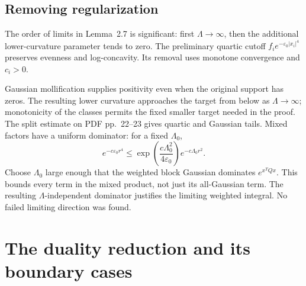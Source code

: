 \documentclass[10pt]{article}
\begin{document}
\subsection*{Removing regularization}
The order of limits in Lemma 2.7 is significant: first \(\Lambda\to\infty\), then the additional lower-curvature parameter tends to zero. The preliminary quartic cutoff \(f_i e^{-\varepsilon_0|x_i|^4}\) preserves evenness and log-concavity. Its removal uses monotone convergence and \(c_i>0\).\par
Gaussian mollification supplies positivity even when the original support has zeros. The resulting lower curvature approaches the target from below as \(\Lambda\to\infty\); monotonicity of the classes permits the fixed smaller target needed in the proof. The split estimate on PDF pp. 22–23 gives quartic and Gaussian tails. Mixed factors have a uniform dominator: for a fixed \(\Lambda_0\), \[e^{-c\varepsilon_0 r^4}
 \le \exp\!\left(\frac{c\Lambda_0^2}{4\varepsilon_0}\right)
       e^{-c\Lambda_0r^2}.\] Choose \(\Lambda_0\) large enough that the weighted block Gaussian dominates \(e^{x^TQx}\). This bounds every term in the mixed product, not just its all-Gaussian term. The resulting \(\Lambda\)-independent dominator justifies the limiting weighted integral. No failed limiting direction was found.\par
\section*{The duality reduction and its boundary cases}
\end{document}
